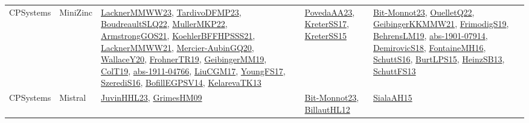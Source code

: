 {\begin{longtable}{lp{3cm}>{\raggedright}p{6cm}>{\raggedright}p{6cm}p{8cm}}
CPSystems & MiniZinc & \href{articles/LacknerMMWW23.pdf}{LacknerMMWW23}\cite{LacknerMMWW23}, \href{papers/TardivoDFMP23.pdf}{TardivoDFMP23}\cite{TardivoDFMP23}, \href{papers/BoudreaultSLQ22.pdf}{BoudreaultSLQ22}\cite{BoudreaultSLQ22}, \href{articles/MullerMKP22.pdf}{MullerMKP22}\cite{MullerMKP22}, \href{papers/ArmstrongGOS21.pdf}{ArmstrongGOS21}\cite{ArmstrongGOS21}, \href{articles/KoehlerBFFHPSSS21.pdf}{KoehlerBFFHPSSS21}\cite{KoehlerBFFHPSSS21}, \href{papers/LacknerMMWW21.pdf}{LacknerMMWW21}\cite{LacknerMMWW21}, \href{papers/Mercier-AubinGQ20.pdf}{Mercier-AubinGQ20}\cite{Mercier-AubinGQ20}, \href{articles/WallaceY20.pdf}{WallaceY20}\cite{WallaceY20}, \href{papers/FrohnerTR19.pdf}{FrohnerTR19}\cite{FrohnerTR19}, \href{papers/GeibingerMM19.pdf}{GeibingerMM19}\cite{GeibingerMM19}, \href{papers/ColT19.pdf}{ColT19}\cite{ColT19}, \href{articles/abs-1911-04766.pdf}{abs-1911-04766}\cite{abs-1911-04766}, \href{papers/LiuCGM17.pdf}{LiuCGM17}\cite{LiuCGM17}, \href{papers/YoungFS17.pdf}{YoungFS17}\cite{YoungFS17}, \href{papers/SzerediS16.pdf}{SzerediS16}\cite{SzerediS16}, \href{papers/BofillEGPSV14.pdf}{BofillEGPSV14}\cite{BofillEGPSV14}, \href{papers/KelarevaTK13.pdf}{KelarevaTK13}\cite{KelarevaTK13} & \href{papers/PovedaAA23.pdf}{PovedaAA23}\cite{PovedaAA23}, \href{articles/KreterSS17.pdf}{KreterSS17}\cite{KreterSS17}, \href{papers/KreterSS15.pdf}{KreterSS15}\cite{KreterSS15} & \href{papers/Bit-Monnot23.pdf}{Bit-Monnot23}\cite{Bit-Monnot23}, \href{papers/OuelletQ22.pdf}{OuelletQ22}\cite{OuelletQ22}, \href{papers/GeibingerKKMMW21.pdf}{GeibingerKKMMW21}\cite{GeibingerKKMMW21}, \href{papers/FrimodigS19.pdf}{FrimodigS19}\cite{FrimodigS19}, \href{papers/BehrensLM19.pdf}{BehrensLM19}\cite{BehrensLM19}, \href{articles/abs-1901-07914.pdf}{abs-1901-07914}\cite{abs-1901-07914}, \href{papers/DemirovicS18.pdf}{DemirovicS18}\cite{DemirovicS18}, \href{papers/FontaineMH16.pdf}{FontaineMH16}\cite{FontaineMH16}, \href{papers/SchuttS16.pdf}{SchuttS16}\cite{SchuttS16}, \href{papers/BurtLPS15.pdf}{BurtLPS15}\cite{BurtLPS15}, \href{articles/HeinzSB13.pdf}{HeinzSB13}\cite{HeinzSB13}, \href{papers/SchuttFS13.pdf}{SchuttFS13}\cite{SchuttFS13}\\
CPSystems & Mistral & \href{papers/JuvinHHL23.pdf}{JuvinHHL23}\cite{JuvinHHL23}, \href{papers/GrimesHM09.pdf}{GrimesHM09}\cite{GrimesHM09} & \href{papers/Bit-Monnot23.pdf}{Bit-Monnot23}\cite{Bit-Monnot23}, \href{papers/BillautHL12.pdf}{BillautHL12}\cite{BillautHL12} & \href{papers/SialaAH15.pdf}{SialaAH15}\cite{SialaAH15}\\

\end{longtable}}
